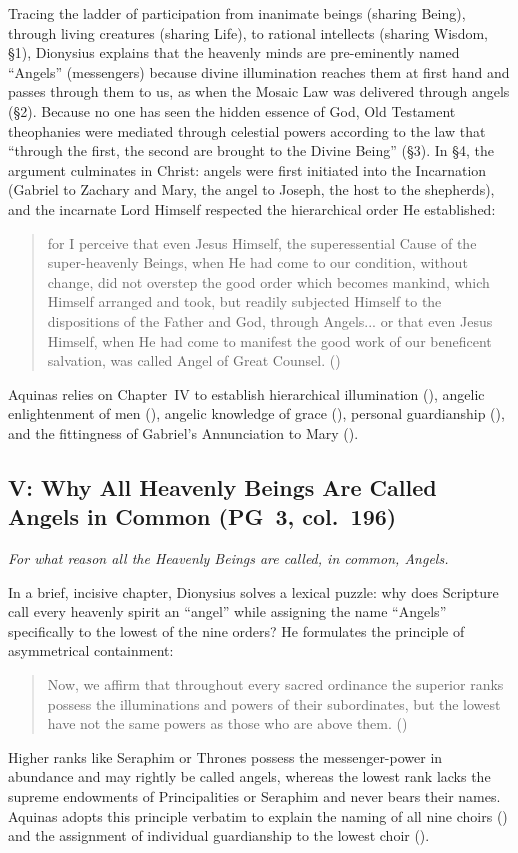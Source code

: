 Tracing the ladder of participation from inanimate beings (sharing Being), through living creatures (sharing Life), to rational intellects (sharing Wisdom, \S 1), Dionysius explains that the heavenly minds are pre-eminently named ``Angels'' (messengers) because divine illumination reaches them at first hand and passes through them to us, as when the Mosaic Law was delivered through angels (\S 2). Because no one has seen the hidden essence of God, Old Testament theophanies were mediated through celestial powers according to the law that ``through the first, the second are brought to the Divine Being'' (\S 3). In \S 4, the argument culminates in Christ: angels were first initiated into the Incarnation (Gabriel to Zachary and Mary, the angel to Joseph, the host to the shepherds), and the incarnate Lord Himself respected the hierarchical order He established:
\begin{quotation}
for I perceive that even Jesus Himself, the superessential Cause of the super-heavenly Beings, when He had come to our condition, without change, did not overstep the good order which becomes mankind, which Himself arranged and took, but readily subjected Himself to the dispositions of the Father and God, through Angels... or that even Jesus Himself, when He had come to manifest the good work of our beneficent salvation, was called Angel of Great Counsel. ()
\end{quotation}
Aquinas relies on Chapter~IV to establish hierarchical illumination (), angelic enlightenment of men (), angelic knowledge of grace (), personal guardianship (), and the fittingness of Gabriel's Annunciation to Mary ().

\subsection{V: Why All Heavenly Beings Are Called Angels in Common (PG~3, col.~196)}
\label{sec:ch-v}
\emph{For what reason all the Heavenly Beings are called, in common, Angels.}

In a brief, incisive chapter, Dionysius solves a lexical puzzle: why does Scripture call every heavenly spirit an ``angel'' while assigning the name ``Angels'' specifically to the lowest of the nine orders? He formulates the principle of asymmetrical containment:
\begin{quotation}
Now, we affirm that throughout every sacred ordinance the superior ranks possess the illuminations and powers of their subordinates, but the lowest have not the same powers as those who are above them. ()
\end{quotation}
Higher ranks like Seraphim or Thrones possess the messenger-power in abundance and may rightly be called angels, whereas the lowest rank lacks the supreme endowments of Principalities or Seraphim and never bears their names. Aquinas adopts this principle verbatim to explain the naming of all nine choirs () and the assignment of individual guardianship to the lowest choir ().

